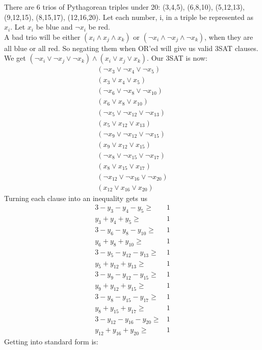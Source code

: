 \documentclass[12pt]{article}
\newenvironment{exercise}[2][Exercise]{\begin{trivlist}
		\item[\hskip \labelsep {\bfseries #1}\hskip \labelsep {\bfseries #2.}]}{\end{trivlist}}
\begin{document}
\begin{exercise}{4}
	There are 6 trios of Pythagorean triples under 20: (3,4,5), (6,8,10), (5,12,13), (9,12,15), (8,15,17), (12,16,20). Let each number, i, in a triple be represented as $x_i$. Let $x_i$ be blue and $\neg x_i$ be red.\\
	A bad trio will be either $(x_i\wedge x_j\wedge x_k)$ or $(\neg x_i\wedge \neg x_j\wedge \neg x_k)$, when they are all blue or all red. So negating them when OR'ed will give us valid 3SAT clauses. We get $(\neg x_i\vee \neg x_j\vee \neg x_k)\wedge (x_i\vee x_j\vee x_k)$. Our 3SAT is now:
	\begin{align*}
		(\neg x_3\vee \neg x_4\vee \neg x_5)\\
		(x_3\vee x_4\vee x_5)\\
		(\neg x_6\vee \neg x_8\vee \neg x_{10})\\
		(x_6\vee x_8\vee x_{10})\\
		(\neg x_5\vee \neg x_{12}\vee \neg x_{13})\\
		(x_5\vee x_{12}\vee x_{13})\\
		(\neg x_9\vee \neg x_{12}\vee \neg x_{15})\\
		(x_9\vee x_{12}\vee x_{15})\\
		(\neg x_8\vee \neg x_{15}\vee \neg x_{17})\\
		(x_8\vee x_{15}\vee x_{17})\\
		(\neg x_{12}\vee \neg x_{16}\vee \neg x_{20})\\
		(x_{12}\vee x_{16}\vee x_{20})
	\end{align*}
	Turning each clause into an inequality gets us
	\begin{align*}
		3 - y_3 - y_4 - y_5 \geq &1\\
		y_3 + y_4 + y_5 \geq &1\\
		3 - y_6 - y_8 - y_{10}\geq &1\\
		y_6 + y_8 + y_{10}\geq &1\\
		3 - y_5 - y_{12} - y_{13}\geq &1\\
		y_5 + y_{12} + y_{13}\geq &1\\
		3 - y_9 - y_{12} - y_{15}\geq &1\\
		y_9 + y_{12} + y_{15}\geq &1\\
		3 - y_8 - y_{15} - y_{17}\geq &1\\
		y_8 + y_{15} + y_{17}\geq &1\\
		3 - y_{12} - y_{16} - y_{20}\geq &1\\
		y_{12} + y_{16} + y_{20}\geq &1
	\end{align*}
	Getting into standard form is:
	\begin{align*}

\end{align*}
\end{exercise}
\end{document}
